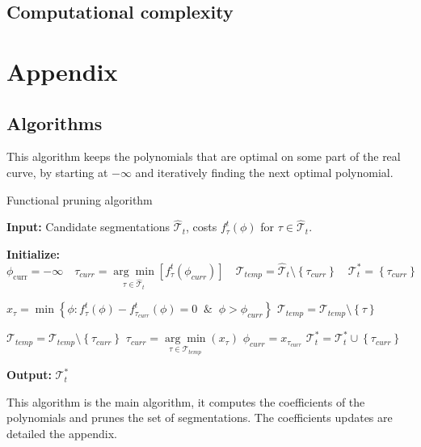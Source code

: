 \documentclass[11pt]{article}
\begin{document}
\subsection{Computational complexity}




\newpage
\section{Appendix}

\subsection{Algorithms}
\label{appendix:algorithms}
This algorithm keeps the polynomials that are optimal on some part of the real curve, by starting at $-\infty$ and iteratively finding the next optimal polynomial.
\begin{algorithm}[H]
    \caption{Functional pruning algorithm}
    \begin{algorithmic}[1]
        \State \textbf{Input:} Candidate segmentations $\hat{\mathcal{T}}_{t}$, costs $f^{t}_{{\tau}}(\phi)$ for ${\tau}\in\hat{\mathcal{T}}_{t}$.

        \State \textbf{Initialize:} $\phi_\text{curr}=-\infty \quad {\tau}_{curr}=\underset{{\tau}\in\hat{\mathcal{T}}_{t}}{ \arg\min}\left[f^{t}_{{\tau}}(\phi_{curr})\right]\quad \mathcal{T}_{temp}=\hat{\mathcal{T}}_{t}\setminus \left\{\tau_{curr}\right\}\quad \mathcal{T}^*_t=\left\{\tau_{curr}\right\}$


        \State $x_{\tau}=\min\left\{\phi:f^{t}_{\tau}(\phi)-f^{t}_{{\tau}_{curr}}(\phi)=0\;\;\&\;\;\phi>\phi_{curr}\right\}$
        \State $\mathcal{T}_{temp}=\mathcal{T}_{temp}\setminus\left\{\tau\right\}$
        \EndIf
        \EndFor

        \State $\mathcal{T}_{temp}=\mathcal{T}_{temp}\setminus \left\{\tau_{curr}\right\}$
        \State $\tau_{curr}=\underset{\tau\in\mathcal{T}_{temp}}{\arg\min}(x_{\tau})$
        \State $\phi_{curr}=x_{\tau_{curr}}$
        \State $\mathcal{T}^*_t=\mathcal{T}^*_t\cup\left\{\tau_{curr}\right\}$
        \EndWhile

        \State \textbf{Output:} $\mathcal{T}^*_t$
    \end{algorithmic}
\end{algorithm}
This algorithm is the main algorithm, it computes the coefficients of the polynomials and prunes the set of segmentations. The coefficients updates are detailed the appendix.
\end{document}
